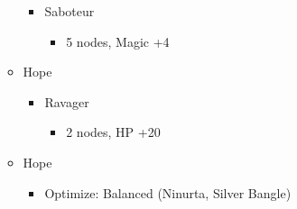 \begin{multicols}{2}
\begin{menu}
\begin{itemize}
\begin{itemize}
				      \begin{itemize}
					      \item Saboteur
					            \begin{itemize}
						            \item 5 nodes, Magic +4
					            \end{itemize}
				      \end{itemize}
				\item Hope
				      \begin{itemize}
					      \item Ravager
					            \begin{itemize}
						            \item 2 nodes, HP +20
					            \end{itemize}
				      \end{itemize}
			\end{itemize}
			\equip
			\begin{itemize}
				\item Hope
				      \begin{itemize}
					      \item Optimize: Balanced (Ninurta, Silver Bangle)
				      \end{itemize}
			\end{itemize}
		\end{itemize}
	\end{menu}

	\renewcommand{\first}{[1] Relentless Assault (\rav/\com/\rav)}
	\renewcommand{\second}{[2] Bully (\syn/\com/\sab)}
	\renewcommand{\third}{[3] Relentless Assault (\rav/\com/\rav)}
	\renewcommand{\fourth}{[4] Smart Bomb (\rav/\rav/\sab)}
	\renewcommand{\fifth}{[5] Tri-Disaster (\rav/\rav/\rav)}
	\renewcommand{\sixth}{[6] Malevolence (\syn/\rav/\rav)}


\end{multicols}
